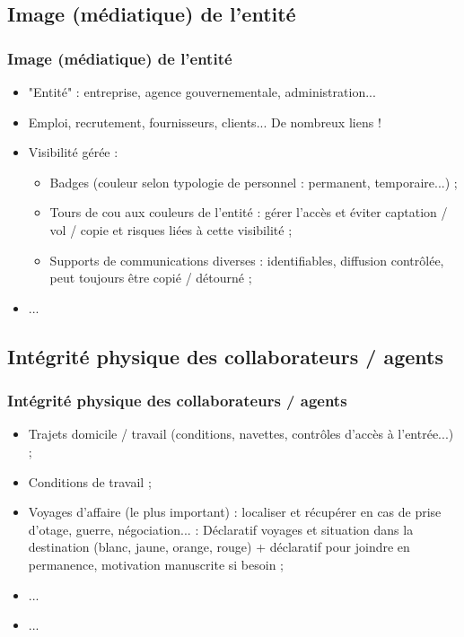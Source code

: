 \documentclass[slidetop,11pt]{beamer}
\begin{document}
\subsection{Image (m{\'e}diatique) de l'entit{\'e}}
\begin{frame}
	\frametitle{Image (m{\'e}diatique) de l'entit{\'e}}
	\begin{itemize}
		\item "Entit{\'e}" : entreprise, agence gouvernementale, administration...
		\item Emploi, recrutement, fournisseurs, clients... De nombreux liens !
		\item Visibilit{\'e} g{\'e}r{\'e}e : 
		\begin{itemize} 
			\item Badges (couleur selon typologie de personnel : permanent, temporaire...) ; 
			\item Tours de cou aux couleurs de l'entit{\'e} : g{\'e}rer l'acc{\`e}s et {\'e}viter captation / vol / copie et risques li{\'e}es {\`a} cette visibilit{\'e} ;
			\item Supports de communications diverses : identifiables, diffusion contr{\^o}l{\'e}e, peut toujours {\^e}tre copi{\'e} / d{\'e}tourn{\'e} ; 
		\end{itemize}
		\item ...
	\end{itemize}
\end{frame}

\subsection{Int{\'e}grit{\'e} physique des collaborateurs / agents}
\begin{frame}
	\frametitle{Int{\'e}grit{\'e} physique des collaborateurs / agents}
	\begin{itemize}
		\item Trajets domicile / travail (conditions, navettes, contr{\^o}les d'acc{\`e}s {\`a} l'entr{\'e}e...) ; 
		\item Conditions de travail ; 
		\item Voyages d'affaire (le plus important) : localiser et r{\'e}cup{\'e}rer en cas de prise d'otage, guerre, n{\'e}gociation... : D{\'e}claratif voyages et situation dans la destination (blanc, jaune, orange, rouge) + d{\'e}claratif pour joindre en permanence, motivation manuscrite si besoin ;
		\item ... 
		\item ... 
	\end{itemize}
\end{frame}
\end{document}
